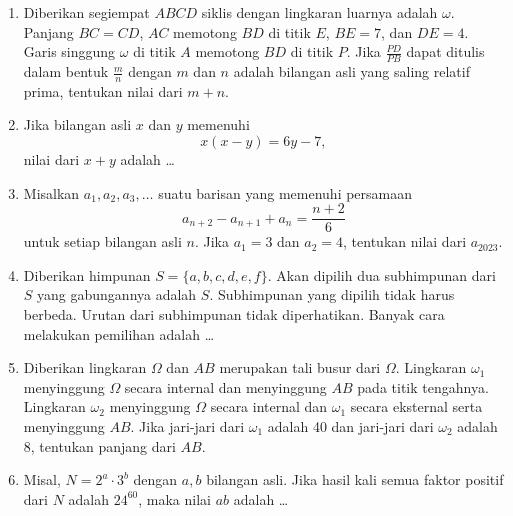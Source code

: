 \begin{enumerate}[resume]
\item Diberikan segiempat $ABCD$ siklis dengan lingkaran luarnya adalah $\omega$. Panjang $BC=CD$, $AC$ memotong $BD$ di titik $E$, $BE=7$, dan $DE=4$. Garis singgung $\omega$ di titik $A$ memotong $BD$ di titik $P$. Jika $\frac{PD}{PB}$ dapat ditulis dalam bentuk $\frac{m}{n}$ dengan $m$ dan $n$ adalah bilangan asli yang saling relatif prima, tentukan nilai dari $m+n$.

\item Jika bilangan asli $x$ dan $y$ memenuhi
$$x(x-y)=6y-7,$$
nilai dari $x+y$ adalah \dots

\item Misalkan $a_1,a_2,a_3,\dots$ suatu barisan yang memenuhi persamaan
$$a_{n+2}-a_{n+1}+a_{n}=\dfrac{n+2}{6}$$
untuk setiap bilangan asli $n$. Jika $a_1=3$ dan $a_2=4$, tentukan nilai dari $a_{2023}$.

\item Diberikan himpunan $S = \{a,b,c,d,e,f\}$. Akan dipilih dua subhimpunan dari $S$ yang gabungannya adalah $S$. Subhimpunan yang dipilih tidak harus berbeda. Urutan dari subhimpunan tidak diperhatikan. Banyak cara melakukan pemilihan adalah \dots

\item Diberikan lingkaran $\Omega$ dan $AB$ merupakan tali busur dari $\Omega$. Lingkaran $\omega_1$ menyinggung $\Omega$ secara internal dan menyinggung $AB$ pada titik tengahnya. Lingkaran $\omega_2$ menyinggung $\Omega$ secara internal dan $\omega_1$ secara eksternal serta menyinggung $AB$. Jika jari-jari dari $\omega_1$ adalah 40 dan jari-jari dari $\omega_2$ adalah 8, tentukan panjang dari $AB$.
\begin{center}
\end{center}

\item Misal, $N = 2^a \cdot 3^b$ dengan $a, b$ bilangan asli. Jika hasil kali semua faktor positif dari $N$ adalah $24^{60}$, maka nilai $ab$ adalah \dots


\end{enumerate}
